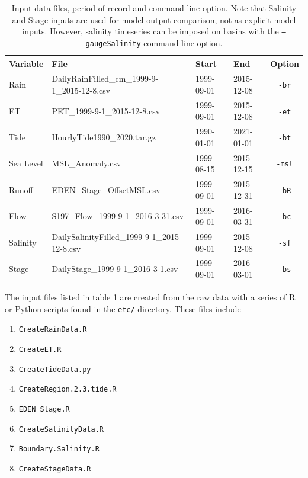 \begin{table}[H]
\caption{
Input data files, period of record and command line option. Note that Salinity and Stage inputs are used for model output comparison, not as explicit model inputs.  However, salinity timeseries can be imposed on basins with the \texttt{--gaugeSalinity} command line option. 
} 
\centering
\begin{tabular}{ l l l l c }
\hline
Variable  & File & Start & End & Option \\
\hline
Rain      & DailyRainFilled\_cm\_1999-9-1\_2015-12-8.csv
          & 1999-09-01 & 2015-12-08 & \texttt{-br} \\
ET        & PET\_1999-9-1\_2015-12-8.csv
          & 1999-09-01 & 2015-12-08 & \texttt{-et} \\
Tide      & HourlyTide1990\_2020.tar.gz
          & 1990-01-01 & 2021-01-01 & \texttt{-bt} \\
Sea Level & MSL\_Anomaly.csv
          & 1999-08-15 & 2015-12-15 & \texttt{-msl} \\
Runoff    & EDEN\_Stage\_OffsetMSL.csv
          & 1999-09-01 & 2015-12-31 & \texttt{-bR} \\
Flow      & S197\_Flow\_1999-9-1\_2016-3-31.csv
          & 1999-09-01 & 2016-03-31 & \texttt{-bc} \\
Salinity  & DailySalinityFilled\_1999-9-1\_2015-12-8.csv
          & 1999-09-01 & 2015-12-08 & \texttt{-sf} \\
Stage     & DailyStage\_1999-9-1\_2016-3-1.csv 
          & 1999-09-01 & 2016-03-01 & \texttt{-bs} \\
\hline
\end{tabular}
\label{table:Input Data Files and Periods}
\end{table}

The input files listed in table \ref{table:Input Data Files and Periods} are created from the raw data with a series of R or Python scripts found in the \texttt{etc/} directory.  These files include\\[-0.5in]
\small
\begin{enumerate}
  \itemsep-8pt
  \item \texttt{CreateRainData.R}
  \item \texttt{CreateET.R}
  \item \texttt{CreateTideData.py}
  \item \texttt{CreateRegion.2.3.tide.R}
  \item \texttt{EDEN\_Stage.R}
  \item \texttt{CreateSalinityData.R}
  \item \texttt{Boundary.Salinity.R}
  \item \texttt{CreateStageData.R}
\end{enumerate}
\large


